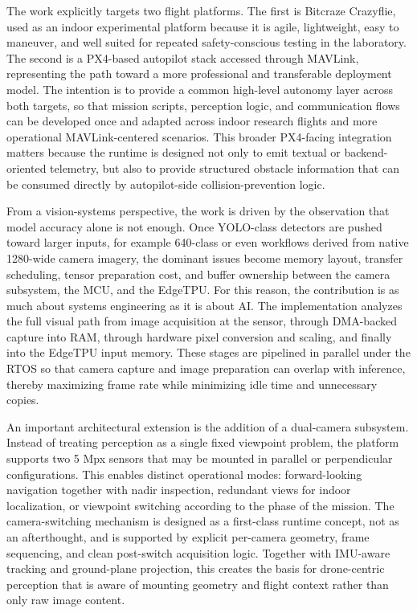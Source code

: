 The work explicitly targets two flight platforms. The first is Bitcraze
Crazyflie, used as an indoor experimental platform because it is agile,
lightweight, easy to maneuver, and well suited for repeated
safety-conscious testing in the laboratory. The second is a PX4-based
autopilot stack accessed through MAVLink, representing the path toward a
more professional and transferable deployment model. The intention is to
provide a common high-level autonomy layer across both targets, so that
mission scripts, perception logic, and communication flows can be
developed once and adapted across indoor research flights and more
operational MAVLink-centered scenarios. This broader PX4-facing
integration matters because the runtime is designed not only to emit
textual or backend-oriented telemetry, but also to provide structured
obstacle information that can be consumed directly by autopilot-side
collision-prevention logic.

From a vision-systems perspective, the work is driven by the observation
that model accuracy alone is not enough. Once YOLO-class detectors are
pushed toward larger inputs, for example 640-class or even workflows
derived from native 1280-wide camera imagery, the dominant issues become
memory layout, transfer scheduling, tensor preparation cost, and buffer
ownership between the camera subsystem, the MCU, and the EdgeTPU. For
this reason, the contribution is as much about systems engineering as it
is about AI. The implementation analyzes the full visual path from image
acquisition at the sensor, through DMA-backed capture into RAM, through
hardware pixel conversion and scaling, and finally into the EdgeTPU
input memory. These stages are pipelined in parallel under the RTOS so
that camera capture and image preparation can overlap with inference,
thereby maximizing frame rate while minimizing idle time and unnecessary
copies.

An important architectural extension is the addition of a dual-camera
subsystem. Instead of treating perception as a single fixed viewpoint
problem, the platform supports two 5 Mpx sensors that may be mounted in
parallel or perpendicular configurations. This enables distinct
operational modes: forward-looking navigation together with nadir
inspection, redundant views for indoor localization, or viewpoint
switching according to the phase of the mission. The camera-switching
mechanism is designed as a first-class runtime concept, not as an
afterthought, and is supported by explicit per-camera geometry, frame
sequencing, and clean post-switch acquisition logic. Together with
IMU-aware tracking and ground-plane projection, this creates the basis
for drone-centric perception that is aware of mounting geometry and
flight context rather than only raw image content.

